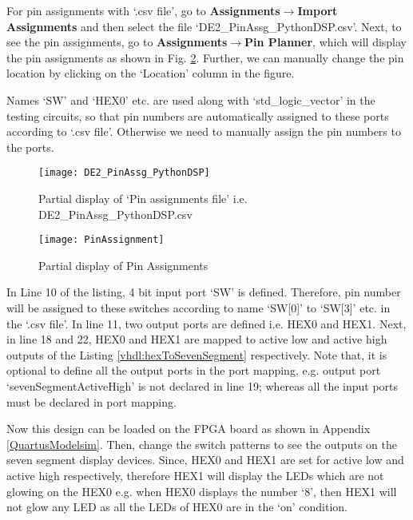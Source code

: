 For pin assignments with `.csv file', go to \textbf{Assignments$\rightarrow$Import Assignments} and then select the file `DE2\_PinAssg\_PythonDSP.csv'. Next, to see the pin assignments, go to \textbf{Assignments$\rightarrow$Pin Planner}, which will display the pin assignments as shown in Fig. \ref{fig:PinAssignment}. Further, we can manually change the pin location by clicking on the `Location' column in the figure. 

\begin{noNumBox}
	Names `SW' and `HEX0' etc. are used along with `std\_logic\_vector' in the testing circuits, so that pin numbers are automatically assigned to these ports according to `.csv file'. Otherwise we need to manually assign the pin numbers to the ports.
\end{noNumBox}

\begin{figure}[!h]
	\centering
	\texttt{[image: DE2\_PinAssg\_PythonDSP]}
	\caption{Partial display of `Pin assignments file' i.e. DE2\_PinAssg\_PythonDSP.csv}
	\label{fig:DE2_PinAssg_PythonDSP}
\end{figure}

\begin{figure}[!h]
	\centering
	\texttt{[image: PinAssignment]}
	\caption{Partial display of Pin Assignments}
	\label{fig:PinAssignment}
\end{figure}

\begin{explanation}
	In Line 10 of the listing, 4 bit input port `SW' is defined. Therefore, pin number will be assigned to these switches according to name `SW[0]' to `SW[3]' etc. in the `.csv file'. In line 11, two output ports are defined i.e. HEX0 and HEX1. Next, in line 18 and 22, HEX0 and HEX1 are mapped to active low and active high outputs of the Listing \ref{vhdl:hexToSevenSegment} respectively. Note that, it is optional to define all the output ports in the port mapping, e.g. output port `sevenSegmentActiveHigh' is not declared in line 19; whereas all the input ports must be declared in port mapping. 
	
	Now this design can be loaded on the FPGA board as shown in Appendix \ref{QuartusModelsim}. Then, change the switch patterns to see the outputs on the seven segment display devices. Since, HEX0 and HEX1 are set for active low and active high respectively, therefore HEX1 will display the LEDs which are not glowing on the HEX0 e.g. when HEX0 displays the number `8', then HEX1 will not glow any LED as all the LEDs of HEX0 are in the `on' condition. 
\end{explanation}

